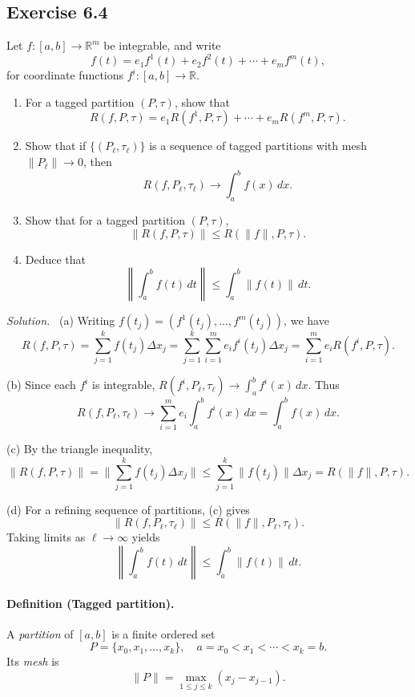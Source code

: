 \documentclass[11pt,a4paper]{article}
\newenvironment{solution}{\par\noindent\textit{Solution.}\ }{\par\vspace{0.5em}}
\begin{document}
\subsection*{Exercise 6.4}
Let $f:[a,b]\to\mathbb{R}^m$ be integrable, and write
\[
f(t) = e_1 f^1(t) + e_2 f^2(t) + \cdots + e_m f^m(t),
\]
for coordinate functions $f^i:[a,b]\to\mathbb{R}$.

\begin{enumerate}[label=\alph*)]
	\item For a tagged partition $(P,\tau)$, show that
	\[
	R(f,P,\tau) = e_1 R(f^1,P,\tau)+\cdots+e_m R(f^m,P,\tau).
	\]
	
	\item Show that if $\{(P_\ell,\tau_\ell)\}$ is a sequence of tagged partitions with mesh $\|P_\ell\|\to 0$, then
	\[
	R(f,P_\ell,\tau_\ell)\to \int_a^b f(x)\,dx.
	\]
	
	\item Show that for a tagged partition $(P,\tau)$,
	\[
	\|R(f,P,\tau)\| \leq R(\|f\|,P,\tau).
	\]
	
	\item Deduce that
	\[
	\left\|\int_a^b f(t)\,dt\right\| \leq \int_a^b \|f(t)\|\,dt.
	\]
\end{enumerate}

\begin{solution}
	(a) Writing $f(t_j)=(f^1(t_j),\dots,f^m(t_j))$, we have
	\[
	R(f,P,\tau) = \sum_{j=1}^k f(t_j)\Delta x_j
	= \sum_{j=1}^k \sum_{i=1}^m e_i f^i(t_j)\Delta x_j
	= \sum_{i=1}^m e_i R(f^i,P,\tau).
	\]
	
	(b) Since each $f^i$ is integrable, $R(f^i,P_\ell,\tau_\ell)\to\int_a^b f^i(x)\,dx$.
	Thus
	\[
	R(f,P_\ell,\tau_\ell)\to \sum_{i=1}^m e_i \int_a^b f^i(x)\,dx
	=\int_a^b f(x)\,dx.
	\]
	
	(c) By the triangle inequality,
	\[
	\|R(f,P,\tau)\| = \Big\|\sum_{j=1}^k f(t_j)\Delta x_j\Big\|
	\leq \sum_{j=1}^k \|f(t_j)\|\Delta x_j
	= R(\|f\|,P,\tau).
	\]
	
	(d) For a refining sequence of partitions, (c) gives
	\[
	\|R(f,P_\ell,\tau_\ell)\|\leq R(\|f\|,P_\ell,\tau_\ell).
	\]
	Taking limits as $\ell\to\infty$ yields
	\[
	\left\|\int_a^b f(t)\,dt\right\|\leq \int_a^b \|f(t)\|\,dt.
	\]
\end{solution}

\paragraph{Definition (Tagged partition).}
A \emph{partition} of $[a,b]$ is a finite ordered set 
\[
P=\{x_0,x_1,\dots,x_k\}, \quad a=x_0 < x_1 < \cdots < x_k=b.
\]
Its \emph{mesh} is
\[
\|P\|=\max_{1\leq j\leq k}(x_j-x_{j-1}).
\]
\end{document}
